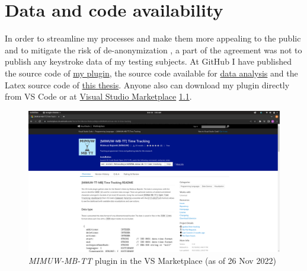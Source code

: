 \chapter{Data and code availability}\label{ch:publishing}

In order to streamline my processes and make them more appealing to the public and to mitigate the risk of de-anonymization \cite{Nar08DeAnon}, a part of the agreement was not to publish any keystroke data of my testing subjects. At GitHub I have published the source code of \href{https://github.com/goalon/time-tracking}{my plugin}, the source code available for \href{https://github.com/goalon/time-tracking-analysis}{data analysis} and the Latex source code of \href{https://github.com/goalon/masters-thesis}{this thesis}. Anyone also can download my plugin directly from VS Code or at \href{https://marketplace.visualstudio.com/items?itemName=MateuszBajorekMIMUW.mimuw-mb-tt-time-tracking}{Visual Studio Marketplace} \ref{fig:marketplace}.

\begin{figure}[htbp]
  \centering
  \includegraphics[scale=0.22]{chapters/availability/graphics/marketplace.png}
  \caption{\textit{MIMUW-MB-TT} plugin in the VS Marketplace (as of 26 Nov 2022)}
  \label{fig:marketplace}
\end{figure}
